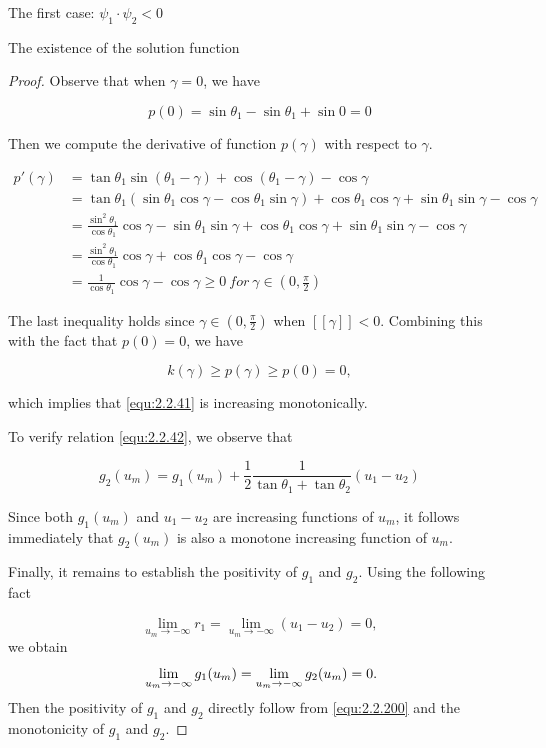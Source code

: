\documentclass[letterpaper,reqno,10pt,twoside]{amsart}
\theoremstyle{definition}
\theoremstyle{remark}
\begin{document}
\begin{section}{The first case: $\psi_1\cdot \psi_2<0$ }
\begin{subsection}{The existence of the solution function}
\begin{proof}
   Observe that when $\gamma=0$, we have

  \begin{equation*}
      p(0)=\sin\theta_1-\sin\theta_1+\sin0=0
  \end{equation*}

  \noindent Then we compute the derivative of function $p(\gamma)$ with respect to $\gamma$.

  \begin{align*}
       p'(\gamma)&=\tan\theta_1\sin(\theta_1-\gamma)+\cos(\theta_1-\gamma)-\cos\gamma \\
       &=\tan\theta_1(\sin\theta_1\cos\gamma-\cos\theta_1\sin\gamma)+\cos\theta_1\cos\gamma+\sin\theta_1\sin\gamma-\cos\gamma \\
        &=\frac{\sin^{2}\theta_1}{\cos\theta_1}\cos\gamma-\sin\theta_1\sin\gamma+\cos\theta_1\cos\gamma+\sin\theta_1\sin\gamma-\cos\gamma\\
         &=\frac{\sin^{2}\theta_1}{\cos\theta_1}\cos\gamma+\cos\theta_1\cos\gamma-\cos\gamma\\
         &=\frac{1}{\cos\theta_1}\cos\gamma-\cos\gamma\geq 0~for~\gamma\in (0,\frac{\pi}{2})
  \end{align*}

  \noindent The last inequality holds since $\gamma\in(0,\frac{\pi}{2})$ when $[\![\gamma]\!]<0$. Combining this with the fact that $p(0)=0$, we have

  \begin{equation*}
      k(\gamma)\geq p(\gamma)\geq p(0)=0,
  \end{equation*}

  \noindent which implies that \eqref{equ:2.2.41} is increasing monotonically.

  To verify relation \eqref{equ:2.2.42}, we observe that

  \begin{equation*}
      g_2(u_{m})=g_{1}(u_{m})+\frac{1}{2}\frac{1}{\tan\theta_1+\tan\theta_2}(u_1-u_2)
  \end{equation*}

  \noindent Since both $g_{1}(u_{m})$ and $u_1-u_2$ are increasing functions of $u_{m}$, it follows immediately that $g_2(u_m)$ is also a monotone increasing function of $u_m$.

  Finally, it remains to establish the positivity of $g_{1}$ and $g_{2}$. Using the following fact

  \begin{equation*}
  \lim_{u_m\rightarrow -\infty}r_1=\lim_{u_m\rightarrow -\infty}(u_1-u_2)=0,
  \end{equation*}
  we obtain
  \begin{equation}{\label{equ:2.2.200}}
      \lim_{u_m\rightarrow -\infty} g_1(u_m)=\lim_{u_m\rightarrow -\infty}g_2(u_m)=0.
  \end{equation}
  Then the positivity of $g_1$ and $g_2$ directly follow from \eqref{equ:2.2.200} and the monotonicity of $g_1$ and $g_2$. 


\end{proof}
\end{subsection}
\end{section}
\end{document}
